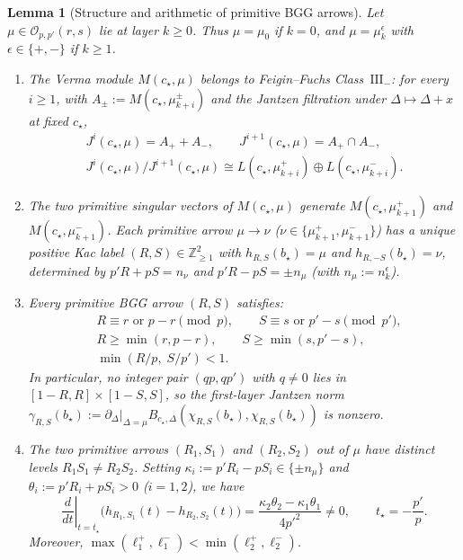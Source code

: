 \documentclass[twoside,10pt]{article}
\numberwithin{equation}{section}
\theoremstyle{slbody}
\newtheorem{lemma}[theorem]{Lemma}
\theoremstyle{definition}
\theoremstyle{remark}
\begin{document}
\begin{lemma}[Structure and arithmetic of primitive BGG arrows]\label{lem:bgg-arrows}
Let \(\mu\in\mathcal{O}_{p,p'}(r,s)\) lie at layer \(k\geq0\).  Thus
\(\mu=\mu_0\) if \(k=0\), and \(\mu=\mu^\epsilon_k\) with
\(\epsilon\in\{+,-\}\) if \(k\geq1\).
\begin{enumerate}
 \item[(i)] The Verma module \(M(c_\star,\mu)\) belongs to Feigin--Fuchs
   Class~\(\mathrm{III}_-\): for every \(i\geq1\), with
   \(A_\pm:=M(c_\star,\mu^\pm_{k+i})\) and the Jantzen filtration under
   \(\Delta\mapsto\Delta+x\) at fixed \(c_\star\),
   \begin{gather*}
    J^i(c_\star,\mu)=A_++A_-,\qquad J^{i+1}(c_\star,\mu)=A_+\cap A_-,\\
    J^i(c_\star,\mu)/J^{i+1}(c_\star,\mu)\cong L(c_\star,\mu^+_{k+i})\oplus L(c_\star,\mu^-_{k+i}).
   \end{gather*}
 \item[(ii)] The two primitive singular vectors of \(M(c_\star,\mu)\) generate
   \(M(c_\star,\mu^+_{k+1})\) and \(M(c_\star,\mu^-_{k+1})\).  Each primitive
   arrow \(\mu\to\nu\) (\(\nu\in\{\mu^+_{k+1},\mu^-_{k+1}\}\)) has a unique
   positive Kac label \((R,S)\in\mathbb{Z}_{\geq1}^2\) with
   \(h_{R,S}(b_\star)=\mu\) and \(h_{R,-S}(b_\star)=\nu\), determined by
   \(p'R+pS=n_\nu\) and \(p'R-pS=\pm n_\mu\) (with \(n_\mu:=n^\epsilon_k\)).
 \item[(iii)] Every primitive BGG arrow \((R,S)\) satisfies:
   \begin{align}
    &R\equiv r\text{ or }p-r\pmod p, \qquad S\equiv s\text{ or }p'-s\pmod{p'},
      \label{eq:RS-mod}\\
    &R\geq\min(r,p-r), \qquad S\geq\min(s,p'-s),
      \label{eq:RS-lower}\\
    &\min(R/p,\;S/p')<1.
      \label{eq:RS-small}
   \end{align}
   In particular, no integer pair \((qp,qp')\) with \(q\neq0\) lies in
   \([1-R,R]\times[1-S,S]\), so the first-layer Jantzen norm
   \(\gamma_{R,S}(b_\star):=\left.\partial_\Delta\right|_{\Delta=\mu}
   B_{c_\star,\Delta}(\chi_{R,S}(b_\star),\chi_{R,S}(b_\star))\) is nonzero.
 \item[(iv)] The two primitive arrows \((R_1,S_1)\) and \((R_2,S_2)\) out of
   \(\mu\) have distinct levels \(R_1S_1\neq R_2S_2\).  Setting
   \(\kappa_i:=p'R_i-pS_i\in\{\pm n_\mu\}\) and \(\theta_i:=p'R_i+pS_i>0\) (\(i=1,2\)),
   we have
   \begin{equation}\label{eq:transverse-slope}
    \left.\frac{d}{dt}\right|_{t=t_\star}
    \bigl(h_{R_1,S_1}(t)-h_{R_2,S_2}(t)\bigr)
    =\frac{\kappa_2\theta_2-\kappa_1\theta_1}{4p'^2}\neq0,
    \qquad t_\star=-\frac{p'}{p}.
   \end{equation}
   Moreover, \(\max(\ell^+_1,\ell^-_1)<\min(\ell^+_2,\ell^-_2)\).
\end{enumerate}
\end{lemma}
\end{document}
